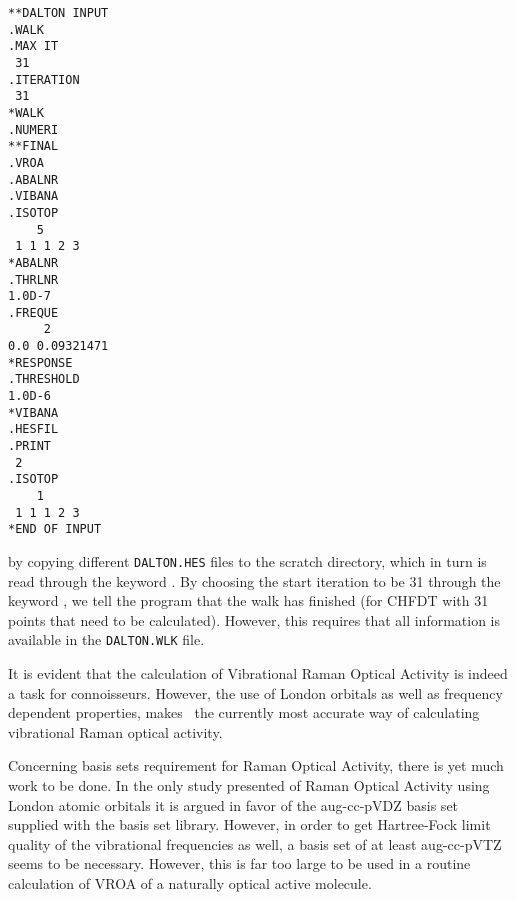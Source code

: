 \begin{verbatim}
**DALTON INPUT
.WALK
.MAX IT
 31
.ITERATION
 31
*WALK
.NUMERI
**FINAL
.VROA
.ABALNR
.VIBANA
.ISOTOP
    5
 1 1 1 2 3
*ABALNR
.THRLNR
1.0D-7
.FREQUE
     2
0.0 0.09321471
*RESPONSE
.THRESHOLD
1.0D-6
*VIBANA
.HESFIL
.PRINT
 2
.ISOTOP
    1
 1 1 1 2 3
*END OF INPUT
\end{verbatim}
by copying different \verb|DALTON.HES| files to the scratch
directory, which in turn is read through the keyword . By
choosing the start iteration to be 31 through the keyword
, we tell the program that the walk has finished (for
CHFDT with 31 points that need to be calculated). However, this
requires that all information is available in the \verb|DALTON.WLK|
file.

It is evident that the calculation of Vibrational Raman Optical
Activity is indeed a task for
connoisseurs. However, the use of London 
orbitals as well as frequency dependent properties, makes \siraba\ the
currently most accurate way of calculating vibrational Raman optical activity. 

Concerning basis sets requirement for Raman Optical Activity, 
there is yet much work to be done. In the only study
presented of Raman Optical Activity using London atomic orbitals it is
argued in favor of the aug-cc-pVDZ basis set supplied with the basis
set library. However, in order to get Hartree-Fock limit quality of
the vibrational frequencies as well, a basis set of at least
aug-cc-pVTZ seems to be necessary. However, this is far too large to
be used in a routine calculation of VROA of a naturally optical active molecule.
